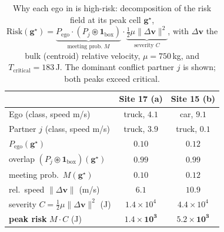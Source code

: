 \documentclass[journal]{IEEEtran}
\begin{document}
\begin{table}[t]
\caption{Why each ego in  is high-risk: decomposition of the risk field at its peak cell $\mathbf{g}^\star$, $\mathrm{Risk}(\mathbf{g}^\star)=\underbrace{P_{\mathrm{ego}}\cdot(P_j\!\circledast\!\mathbf{1}_{\mathrm{box}})}_{\text{meeting prob.\ }M}\cdot\underbrace{\tfrac12\mu\|\Delta\mathbf{v}\|^2}_{\text{severity }C}$, with $\Delta\mathbf{v}$ the bulk (centroid) relative velocity, $\mu{=}750$\,kg, and $T_{\mathrm{critical}}{=}183$\,J. The dominant conflict partner $j$ is shown; both peaks exceed critical.}
\label{tab:ad4che_decomp}
\centering
\setlength{\tabcolsep}{5pt}
\begin{tabular}{l c c}
\toprule
 & \textbf{Site 17 (a)} & \textbf{Site 15 (b)} \\
\midrule
Ego (class, speed m/s)            & truck, $4.1$       & car, $9.1$ \\
Partner $j$ (class, speed m/s)    & truck, $3.9$       & truck, $0.1$ \\
$P_{\mathrm{ego}}(\mathbf{g}^\star)$               & $0.10$             & $0.12$ \\
overlap $(P_j\!\circledast\!\mathbf{1}_{\mathrm{box}})(\mathbf{g}^\star)$ & $0.99$ & $0.99$ \\
meeting prob.\ $M(\mathbf{g}^\star)$               & $0.10$             & $0.12$ \\
rel.\ speed $\|\Delta\mathbf{v}\|$ (m/s)           & $6.1$              & $10.9$ \\
severity $C=\tfrac12\mu\|\Delta\mathbf{v}\|^2$ (J) & $1.4{\times}10^{4}$ & $4.4{\times}10^{4}$ \\
\textbf{peak risk} $M\!\cdot\!C$ (J)               & $\mathbf{1.4{\times}10^{3}}$ & $\mathbf{5.2{\times}10^{3}}$ \\
\bottomrule
\end{tabular}
\end{table}
\end{document}
